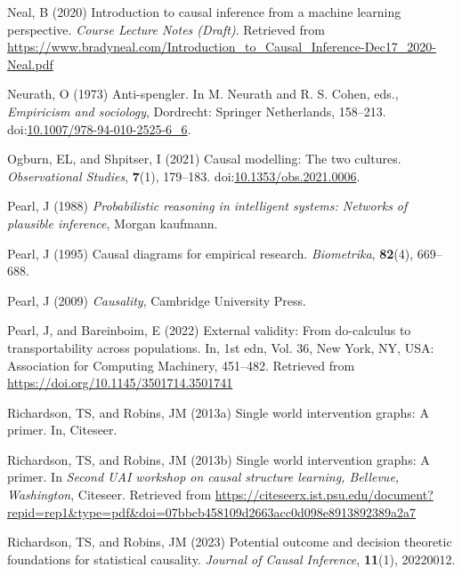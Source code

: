 \documentclass[
  single column]{article}
\newlength{\cslhangindent}
\newenvironment{CSLReferences}[2] %
 {\begin{list}{}{%
  \setlength{\itemindent}{0pt}
  \setlength{\leftmargin}{0pt}
  \setlength{\parsep}{0pt}
  \ifodd #1
   \setlength{\leftmargin}{\cslhangindent}
   \setlength{\itemindent}{-1\cslhangindent}
  \fi
  \setlength{\itemsep}{#2\baselineskip}}}
 {\end{list}}
\begin{document}
\begin{CSLReferences}{1}{0}
Neal, B (2020) Introduction to causal inference from a machine learning
perspective. \emph{Course Lecture Notes (Draft)}. Retrieved from
\url{https://www.bradyneal.com/Introduction_to_Causal_Inference-Dec17_2020-Neal.pdf}

Neurath, O (1973) Anti-spengler. In M. Neurath and R. S. Cohen, eds.,
\emph{Empiricism and sociology}, Dordrecht: Springer Netherlands,
158--213.
doi:\href{https://doi.org/10.1007/978-94-010-2525-6_6}{10.1007/978-94-010-2525-6\_6}.

Ogburn, EL, and Shpitser, I (2021) Causal modelling: The two cultures.
\emph{Observational Studies}, \textbf{7}(1), 179--183.
doi:\href{https://doi.org/10.1353/obs.2021.0006}{10.1353/obs.2021.0006}.

Pearl, J (1988) \emph{Probabilistic reasoning in intelligent systems:
Networks of plausible inference}, Morgan kaufmann.

Pearl, J (1995) Causal diagrams for empirical research.
\emph{Biometrika}, \textbf{82}(4), 669--688.

Pearl, J (2009) \emph{Causality}, Cambridge University Press.

Pearl, J, and Bareinboim, E (2022) External validity: From do-calculus
to transportability across populations. In, 1st edn, Vol. 36, New York,
NY, USA: Association for Computing Machinery, 451--482. Retrieved from
\url{https://doi.org/10.1145/3501714.3501741}

Richardson, TS, and Robins, JM (2013a) Single world intervention graphs:
A primer. In, Citeseer.

Richardson, TS, and Robins, JM (2013b) Single world intervention graphs:
A primer. In \emph{Second UAI workshop on causal structure learning,
{B}ellevue, {W}ashington}, Citeseer. Retrieved from
\url{https://citeseerx.ist.psu.edu/document?repid=rep1&type=pdf&doi=07bbcb458109d2663acc0d098e8913892389a2a7}

Richardson, TS, and Robins, JM (2023) Potential outcome and decision
theoretic foundations for statistical causality. \emph{Journal of Causal
Inference}, \textbf{11}(1), 20220012.


\end{CSLReferences}
\end{document}
